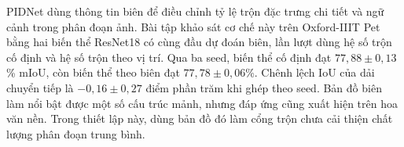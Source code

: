 PIDNet dùng thông tin biên để điều chỉnh tỷ lệ trộn đặc trưng chi tiết và ngữ cảnh trong phân đoạn ảnh. Bài tập khảo sát cơ chế này trên Oxford-IIIT Pet bằng hai biến thể ResNet18 có cùng đầu dự đoán biên, lần lượt dùng hệ số trộn cố định và hệ số trộn theo vị trí. Qua ba seed, biến thể cố định đạt $77{,}88\pm0{,}13$\% mIoU, còn biến thể theo biên đạt $77{,}78\pm0{,}06$\%. Chênh lệch IoU của dải chuyển tiếp là $-0{,}16\pm0{,}27$ điểm phần trăm khi ghép theo seed. Bản đồ biên làm nổi bật được một số cấu trúc mảnh, nhưng đáp ứng cũng xuất hiện trên hoa văn nền. Trong thiết lập này, dùng bản đồ đó làm cổng trộn chưa cải thiện chất lượng phân đoạn trung bình.
